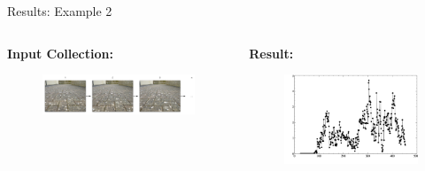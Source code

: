 \documentclass[10pt, compress]{beamer}
\begin{document}
\begin{frame}{Results: Example 2}

\begin{columns}[T] %
\begin{column}{.48\textwidth}

\textbf{Input Collection:}

\begin{figure}[ht!]
\centering
\vspace{0.3cm}
\includegraphics[scale=0.18]{calibimages.png}
\end{figure}

\end{column}%
\hfill%
\begin{column}{.48\textwidth}

\textbf{Result:}
\begin{figure}[ht!]
\centering
\includegraphics[scale=0.22]{wiltshire_outside_10cm.png}
\end{figure}

\end{column}%
\end{columns}

\end{frame}
\end{document}
